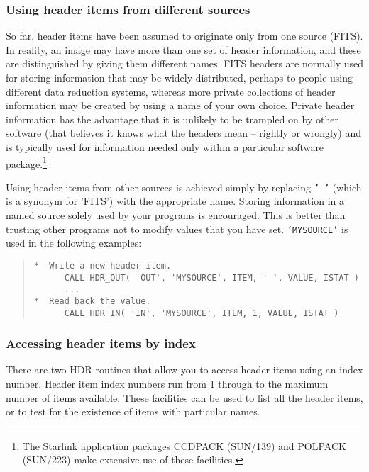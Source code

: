 \documentclass[twoside,11pt]{article}
\newcommand{\xref}[3]{#1}
\renewcommand{\_}{\texttt{\symbol{95}}}
\newcommand{\myverb}[1]{{\texttt{#1}}}
\newenvironment{code}{\begin{small} \begin{quote}}
                     {\end{quote} \end{small}}
\begin{document}
\subsubsection{Using \label{IMGNAMEDEXTENSIONS}header items from different sources}
So far, header items have been assumed to originate only from one
source (FITS). In reality, an image may have more than one
set of header information, and these are distinguished by giving them
different names. FITS headers are normally used for storing
information that may be widely distributed, perhaps to people using
different data reduction systems, whereas more private collections of
header information may be created by using a name of your own
choice. Private header information has the advantage that it is
unlikely to be trampled on by other software (that believes it knows
what the headers mean -- rightly or wrongly) and is typically used for
information needed only within a particular software
package.\footnote{The Starlink application packages CCDPACK
(\xref{SUN/139}{sun139}{}) and POLPACK (\xref{SUN/223}{sun223}{}) make
extensive use of these facilities.}

Using header items from other sources is achieved simply by replacing
\myverb{' '} (which is a synonym for 'FITS') with the appropriate
name.  Storing information in a named source solely used by your
programs is encouraged. This is better than trusting other programs
not to modify values that you have set. \myverb{'MYSOURCE'} is used in
the following examples:
\begin{code}
\begin{verbatim}
*  Write a new header item.
      CALL HDR_OUT( 'OUT', 'MYSOURCE', ITEM, ' ', VALUE, ISTAT )
      ...
*  Read back the value.
      CALL HDR_IN( 'IN', 'MYSOURCE', ITEM, 1, VALUE, ISTAT )
\end{verbatim}
\end{code}

\subsubsection{Accessing header items by index \label{HDRINDEXING}}
There are two HDR routines that allow you to access header items using
an index number. Header item index numbers run from 1 through to the
maximum number of items available. These facilities can be used to
list all the header items, or to test for the existence of items with
particular names.
\end{document}
